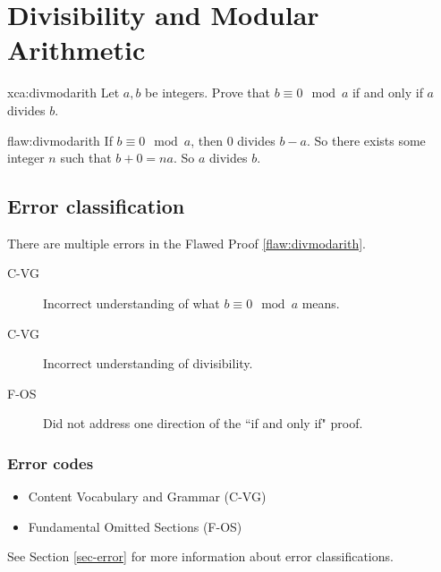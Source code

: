 \section{Divisibility and Modular Arithmetic}

\begin{xca}{xca:divmodarith}
Let $a,b$ be integers. Prove that $b \equiv 0 \mod a$ if and only if $a$ divides $b$. 
\end{xca}

\begin{flaw}{flaw:divmodarith} %
If $b \equiv 0 \mod a$, then $0$ divides $b-a$. So there exists some integer $n$ such that $b+0 = na$. So $a$ divides $b$. 
\end{flaw}

\clearpage
\subsection{Error classification}


There are multiple errors
 in the Flawed Proof \ref{flaw:divmodarith}. 
 
 \begin{description}
  \item[C-VG] Incorrect understanding of what $b \equiv 0 \mod a$ means. 
  \item[C-VG] Incorrect understanding of divisibility.
    \item[F-OS]  Did not address one direction of the ``if and only if" proof. 
 	
 \end{description}

 
\subsubsection{Error codes}
\begin{itemize}
    \item Content Vocabulary and Grammar (C-VG)
    \item Fundamental Omitted Sections (F-OS)
\end{itemize}
See Section \ref{sec-error} for more information about error classifications.

